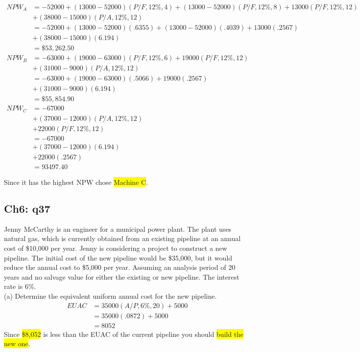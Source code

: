 \documentclass[12pt]{article}
\newcommand{\hilight}[1]{\colorbox{yellow}{#1}}
\begin{document}
\begin{align*}
NPW_A &= -52000 + (13000 - 52000)(P/F, 12\%, 4) + (13000 - 52000)(P/F, 12\%, 8) + 13000(P/F, 12\%, 12)\\
      &+ (38000- 15000)(P/A, 12\%, 12)\\
      &= -52000 + (13000 - 52000)(.6355) + (13000 - 52000)(.4039) + 13000(.2567)\\
      &+ (38000- 15000)(6.194)\\
      &=\$53,262.50\\
NPW_B &= -63000 + (19000 - 63000)(P/F, 12\%, 6) + 19000(P/F, 12\%, 12)\\
      &+ (31000- 9000)(P/A, 12\%, 12)\\
      &= -63000 + (19000 - 63000)(.5066) + 19000(.2567)\\
      &+ (31000- 9000)(6.194)\\
      &=\$55,854.90\\
NPW_C &= -67000\\
      &+ (37000-12000)(P/A, 12\%, 12)\\
      &+ 22000(P/F, 12\%, 12)\\
      &= -67000\\
      &+ (37000-12000)(6.194)\\
      &+ 22000(.2567)\\
      &= 93497.40
\end{align*}

Since it has the highest NPW chose \hilight{Machine C}.

\subsection*{Ch6: q37}
Jenny McCarthy is an engineer for a municipal power plant. The plant uses natural gas, which is currently obtained from an existing pipeline at an annual cost of \$10,000 per year. Jenny is considering a project to construct  a new pipeline. The initial cost of the new pipeline would be \$35,000, but it would reduce the annual cost to \$5,000 per year. Assuming an analysis period of 20 years and no salvage value for either the existing or new pipeline. The interest rate is 6\%.\\
(a) Determine the equivalent uniform annual cost for the new pipeline.\\
\begin{align*}
EUAC &= 35000(A/P, 6\%, 20) + 5000\\
    &= 35000(.0872) + 5000\\
    &= 8052
\end{align*}
Since \hilight{\$8,052} is less than the EUAC of the current pipeline you should \hilight{build the new one}.
\end{document}

